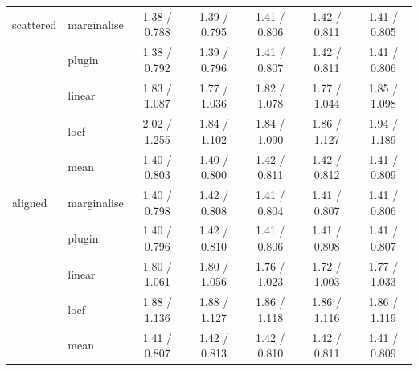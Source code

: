 \begin{table}[htbp]
\begin{tabular}{llccccc}
    \addlinespace
    scattered & marginalise & 1.38 / 0.788 & 1.39 / 0.795 & 1.41 / 0.806 & 1.42 / 0.811 & 1.41 / 0.805 \\
     & plugin & 1.38 / 0.792 & 1.39 / 0.796 & 1.41 / 0.807 & 1.42 / 0.811 & 1.41 / 0.806 \\
     & linear & 1.83 / 1.087 & 1.77 / 1.036 & 1.82 / 1.078 & 1.77 / 1.044 & 1.85 / 1.098 \\
     & locf & 2.02 / 1.255 & 1.84 / 1.102 & 1.84 / 1.090 & 1.86 / 1.127 & 1.94 / 1.189 \\
     & mean & 1.40 / 0.803 & 1.40 / 0.800 & 1.42 / 0.811 & 1.42 / 0.812 & 1.41 / 0.809 \\
    \addlinespace
    aligned & marginalise & 1.40 / 0.798 & 1.42 / 0.808 & 1.41 / 0.804 & 1.41 / 0.807 & 1.41 / 0.806 \\
     & plugin & 1.40 / 0.796 & 1.42 / 0.810 & 1.41 / 0.806 & 1.41 / 0.808 & 1.41 / 0.807 \\
     & linear & 1.80 / 1.061 & 1.80 / 1.056 & 1.76 / 1.023 & 1.72 / 1.003 & 1.77 / 1.033 \\
     & locf & 1.88 / 1.136 & 1.88 / 1.127 & 1.86 / 1.118 & 1.86 / 1.116 & 1.86 / 1.119 \\
     & mean & 1.41 / 0.807 & 1.42 / 0.813 & 1.42 / 0.810 & 1.42 / 0.811 & 1.41 / 0.809 \\
    \bottomrule
  \end{tabular}
\end{table}
